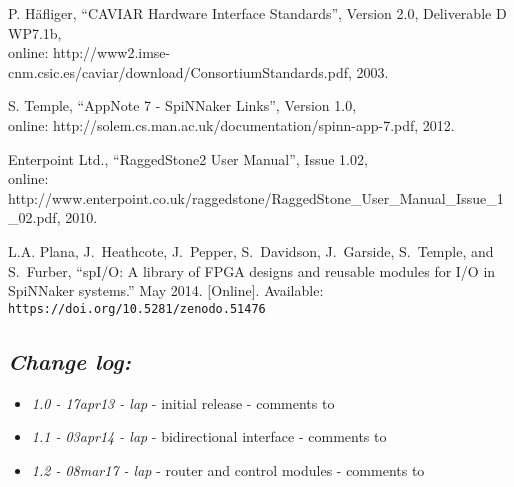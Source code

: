 \begin{thebibliography}{10}

P. H\"{a}fliger, ``CAVIAR Hardware Interface Standards'', Version 2.0, Deliverable D WP7.1b,
\\online: http://www2.imse-cnm.csic.es/caviar/download/ConsortiumStandards.pdf, 2003.

S. Temple, ``AppNote 7 - SpiNNaker Links'', Version 1.0,
\\online: http://solem.cs.man.ac.uk/documentation/spinn-app-7.pdf, 2012.

Enterpoint Ltd., ``RaggedStone2 User Manual'', Issue 1.02,
\\online: http://www.enterpoint.co.uk/raggedstone/RaggedStone\_User\_Manual\_Issue\_1\_02.pdf, 2010.

{L.A. Plana}, J.~Heathcote, J.~Pepper, S.~Davidson, J.~Garside, S.~Temple, and
  S.~Furber, ``{spI/O: A library of FPGA designs and reusable modules for I/O
  in SpiNNaker systems.}'' May 2014. [Online]. Available:
  \tt{https://doi.org/10.5281/zenodo.51476}

\end{thebibliography}


\subsection{\itshape Change log:}

\begin{itemize}
\item {\itshape 1.0 - 17apr13 - lap} - initial release - comments to
  {\itshape \Email}
\item {\itshape 1.1 - 03apr14 - lap} - bidirectional interface - comments to
  {\itshape \Email}
\item {\itshape 1.2 - 08mar17 - lap} - router and control modules - comments to
  {\itshape \Email}
\end{itemize}



